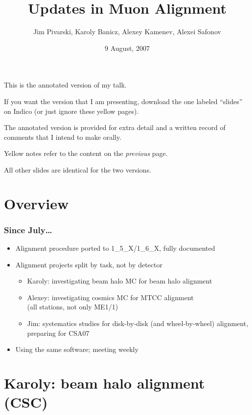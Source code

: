 \documentclass[compress]{beamer}
\title{Updates in Muon Alignment}
\author{Jim Pivarski, Karoly Banicz, Alexey Kamenev, Alexei Safonov}
\institute{Texas A\&M University}
\date{ 9 August, 2007}
\begin{document}
\frame{\titlepage}

\begin{notes}
\item This is the annotated version of my talk.
\item If you want the version that I am presenting, download the one
labeled ``slides'' on Indico (or just ignore these yellow pages).
\item The annotated version is provided for extra detail and a written
record of comments that I intend to make orally.
\item Yellow notes refer to the content on the {\it previous} page.
\item All other slides are identical for the two versions.
\end{notes}

\section*{Overview}

\begin{frame}
\frametitle{Since July\ldots}
\begin{itemize}\setlength{\itemsep}{0.75 cm}
\item Alignment procedure ported to 1\_5\_X/1\_6\_X, fully documented
\item Alignment projects split by task, not by detector

\vspace{0.25 cm}
\begin{itemize}\setlength{\itemsep}{0.5 cm}
\item Karoly: investigating beam halo MC for beam halo alignment
\item Alexey: investigating cosmics MC for MTCC alignment \\ (all stations, not only ME1/1)
\item Jim: systematics studies for disk-by-disk (and wheel-by-wheel) alignment, preparing for CSA07
\end{itemize}

\item Using the same software; meeting weekly
\end{itemize}
\end{frame}

\section*{Karoly: beam halo alignment (CSC)}
\end{document}
